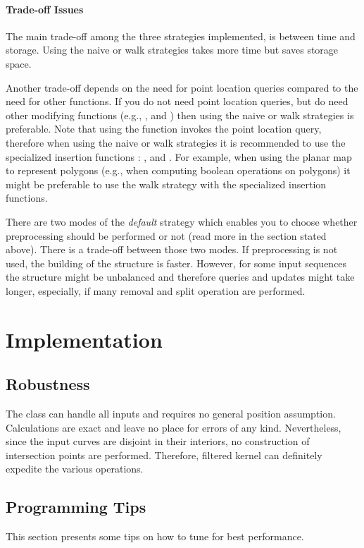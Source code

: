 \paragraph{Trade-off Issues}

The main trade-off among the three strategies implemented, is between
time and storage. Using the naive or walk strategies takes more
time but saves storage space.

Another trade-off depends on the need for point location queries compared
to the need for other functions. If you do not need point location 
queries, but do need other modifying functions (e.g., , 
 and ) then using the naive or walk strategies
is preferable. Note that using the  function invokes the
point location query, therefore when using the naive or walk strategies it
is recommended to use the specialized insertion functions : 
,  and 
.
For example, when using the planar map to represent polygons (e.g., when
computing boolean operations on polygons) it might be preferable to use
the walk strategy with the specialized insertion functions. 

There are two modes of the {\it default\/} strategy which enables
you to choose whether preprocessing should be performed or not (read
more in the section stated above).
There is a trade-off between those two modes. If
preprocessing is not used, the building of the structure is faster. However,
for some input sequences the structure might be unbalanced and therefore 
queries and updates might take longer, especially, if many removal and split 
operation are performed.

\section{Implementation}
\subsection{Robustness}
The  class can handle all inputs and
requires no general position assumption. Calculations are exact and
leave no place for errors of any kind. Nevertheless, since the input
curves are disjoint in their interiors, no construction of
intersection points are performed. Therefore, filtered kernel can
definitely expedite the various operations.

\subsection{Programming Tips}
This section presents some tips on how to tune
 for best performance.

